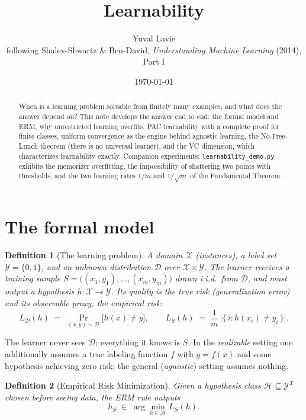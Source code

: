 \documentclass[11pt]{article}
\title{Learnability}
\author{Yuval Lavie\\[2pt]
\small following Shalev-Shwartz \& Ben-David,
\emph{Understanding Machine Learning} (2014), Part I}
\date{\today}
\newtheorem{definition}{Definition}
\newcommand{\X}{\mathcal{X}}
\newcommand{\Y}{\mathcal{Y}}
\newcommand{\D}{\mathcal{D}}
\newcommand{\Hyp}{\mathcal{H}}
\newcommand{\err}{L_{\D}}
\newcommand{\emperr}{L_{S}}
\begin{document}
\maketitle

\begin{abstract}
When is a learning problem solvable from finitely many examples, and what
does the answer depend on? This note develops the answer end to end:
the formal model and ERM, why unrestricted learning overfits, PAC
learnability with a complete proof for finite classes, uniform convergence
as the engine behind agnostic learning, the No-Free-Lunch theorem (there
is no universal learner), and the VC dimension, which characterizes
learnability exactly. Companion experiments:
\texttt{learnability\_demo.py} exhibits the memorizer overfitting, the
impossibility of shattering two points with thresholds, and the two
learning rates $1/m$ and $1/\sqrt{m}$ of the Fundamental Theorem.
\end{abstract}

\section{The formal model}

\begin{definition}[The learning problem]
A \emph{domain} $\X$ (instances), a \emph{label set} $\Y = \{0,1\}$, and
an unknown distribution $\D$ over $\X \times \Y$. The learner receives a
\emph{training sample} $S = \bigl((x_1,y_1),\dots,(x_m,y_m)\bigr)$ drawn
i.i.d.\ from $\D$, and must output a \emph{hypothesis}
$h:\X \to \Y$. Its quality is the \emph{true risk} (generalization error)
and its observable proxy, the \emph{empirical risk}:
\begin{equation}
  \err(h) \;=\; \Pr_{(x,y)\sim\D}\bigl[h(x)\ne y\bigr],
  \qquad
  \emperr(h) \;=\; \frac1m\,\bigl|\{\,i : h(x_i)\ne y_i\,\}\bigr| .
  \label{eq:risks}
\end{equation}
\end{definition}

The learner never sees $\D$; everything it knows is $S$. In the
\emph{realizable} setting one additionally assumes a true labeling
function $f$ with $y = f(x)$ and some hypothesis achieving zero risk; the
general (\emph{agnostic}) setting assumes nothing.

\begin{definition}[Empirical Risk Minimization]
Given a \emph{hypothesis class} $\Hyp \subseteq \Y^{\X}$ chosen before
seeing data, the ERM rule outputs
\begin{equation}
  h_S \;\in\; \arg\min_{h\in\Hyp} \emperr(h) .
  \label{eq:erm}
\end{equation}
\end{definition}
\end{document}
